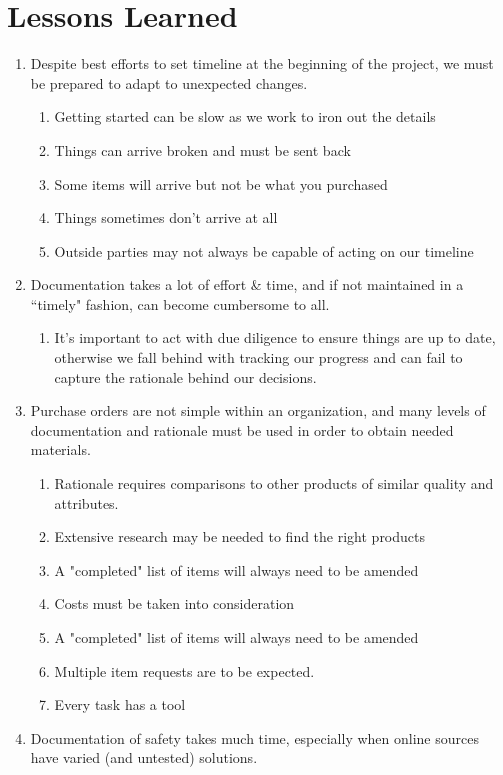 ﻿\documentclass{article}
\begin{document}
\section{Lessons Learned}
\begin{enumerate}
\item Despite best efforts to set timeline at the beginning of the project, we must be prepared to adapt to unexpected changes.
\begin{enumerate}
\item Getting started can be slow as we work to iron out the details
\item Things can arrive broken and must be sent back
\item Some items will arrive but not be what you purchased
\item Things sometimes don't arrive at all
\item Outside parties may not always be capable of acting on our timeline
\end{enumerate}
\item Documentation takes a lot of effort & time, and if not maintained in a ``timely" fashion, can become cumbersome to all.
\begin{enumerate}
\item It's important to act with due diligence to ensure things are up to date, otherwise we fall behind with tracking our progress and can fail to capture the rationale behind our decisions.
\end{enumerate}
\item Purchase orders are not simple within an organization, and many levels of documentation and rationale must be used in order to obtain needed materials.
\begin{enumerate}
\item Rationale requires comparisons to other products of similar quality and attributes.
\item Extensive research may be needed to find the right products
\item A "completed" list of items will always need to be amended
\item Costs must be taken into consideration
\item A "completed" list of items will always need to be amended
\item Multiple item requests are to be expected.
\item Every task has a tool
\end{enumerate}
\item Documentation of safety takes much time, especially when online sources have varied (and untested) solutions.

\end{enumerate}
\end{document}

